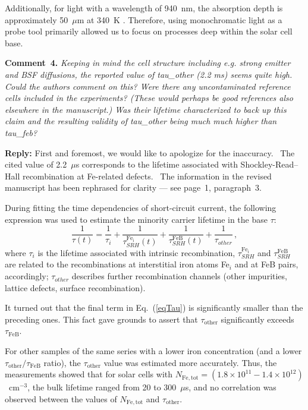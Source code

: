 \documentclass{WileyMSP-template}
\begin{document}
Additionally, for light with a wavelength of 940~nm, the absorption depth is approximately 50~$\mu$m at 340~K \cite{Green2022}.
Therefore, using monochromatic light as a probe tool primarily allowed us to focus on processes deep within the solar cell base.


\vspace{1cm}
\noindent
\textcolor[rgb]{0.00,0.50,1.00}{\textbf{Comment~4.}}
\emph{Keeping in mind the cell structure including e.g. strong emitter and BSF diffusions,
the reported value of tau\_other (2.2 ms) seems quite high.
Could the authors comment on this?
Were there any uncontaminated reference cells included in the experiments?
(These would perhaps be good references also elsewhere in the manuscript.)
Was their lifetime characterized to back up this claim and the resulting validity of tau\_other being much much higher than tau\_feb?
}


\noindent
\textcolor[rgb]{0.51,0.00,0.00}{\textbf{Reply:}}
First and foremost, we would like to apologize for the inaccuracy. 
The cited value of 2.2~$\mu$s corresponds to the lifetime associated with Shockley-Read–Hall recombination at Fe-related defects. 
The information in the revised manuscript has been rephrased for clarity --- see page~1, paragraph~3.

During fitting the time dependencies of short-circuit current,
the following expression was used to estimate the minority carrier lifetime in the base $\tau$:
\begin{equation}
\label{eqTau}
\frac{1}{\tau(t)}=\frac{1}{\tau_i}+\frac{1}{\tau_{SRH}^{\mathrm{Fe_i}}(t)}
+\frac{1}{\tau_{SRH}^\mathrm{FeB}(t)}+\frac{1}{\tau_{other}}\,,
\end{equation}
where
$\tau_i$ is the lifetime associated with intrinsic recombination,
$\tau_{SRH}^{\mathrm{Fe_i}}$ and $\tau_{SRH}^\mathrm{FeB}$ are related to the recombinations at interstitial iron atoms Fe$_i$ and at FeB pairs, accordingly;
$\tau_{other}$ describes further recombination channels
(other impurities, lattice defects, surface recombination).

It turned out that the final term in Eq.~(\ref{eqTau}) is significantly smaller than the preceding ones.
This fact gave grounds to assert that $\tau_\mathrm{other}$ significantly exceeds $\tau_\mathrm{FeB}$.

For other samples of the same series with a lower iron concentration (and a lower $\tau_\mathrm{other}/\tau_\mathrm{FeB}$ ratio), 
the $\tau_\mathrm{other}$  value was estimated more accurately.
Thus, the measurements showed that for solar cells with
$N_\mathrm{Fe,tot}=(1.8\times10^{11}-1.4\times10^{12})$~cm$^{-3}$,
the bulk lifetime ranged from 20 to 300~$\mu$s,
and no correlation was observed between the values of $N_\mathrm{Fe,tot}$ and $\tau_\mathrm{other}$.
\end{document}
